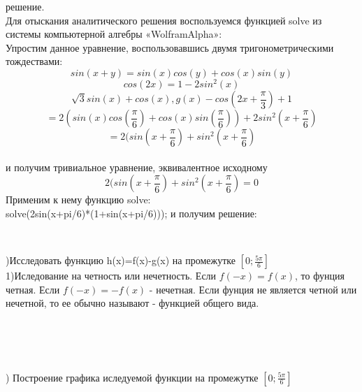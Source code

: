 \documentclass[russian,utf8,nocolumnxxxi,nocolumnxxxii]{eskdtext}
\begin{document}
\newpage
{ решение.}\\
Для отыскания аналитического решения воспользуемся функцией solve из системы компьютерной алгебры «WolframAlpha»:\\
Упростим данное уравнение, воспользовавшись двумя тригонометрическими тождествами: $$sin(x+y)=sin(x)cos(y)+cos(x)sin(y)$$
$$cos(2x)=1-2sin^2(x) $$
$$\sqrt{3}sin(x)+cos(x),g(x)-cos(2x+\frac{\pi}{3})+1$$ $$=2(sin(x)cos(\frac{\pi}{6})+cos(x)sin(\frac{\pi}{6}))+2sin^2(x+\frac{\pi}{6})$$ $$=2(sin(x+\frac{\pi}{6})+sin^2(x+\frac{\pi}{6})$$\\
и получим тривиальное уравнение, эквивалентное исходному
$$2(sin(x+\frac{\pi}{6})+sin^2(x+\frac{\pi}{6})=0$$
Применим к нему функцию solve:\\
solve(2sin(x+pi/6)*(1+sin(x+pi/6)));
и получим решение:
\begin{center}
\begin{minipage}[h]{0.65\linewidth}
  \\
\end{minipage}
\end{center}

\newpage
{)Исследовать функцию h(x)=f(x)-g(x) на промежутке $[0;\frac{5\pi}{6}]$ }\\
1)Иследование на четность или нечетность.
Если $f(-x)=f(x)$, то фунция четная. Если $f(-x)=-f(x)$ - нечетная. Если фунция не является четной или нечетной, то ее обычно называют - функцией общего вида.\\
\begin{center}
\begin{minipage}[h]{0.65\linewidth}
  \\
  \\
  \\
\end{minipage}
\end{center}

) Построение графика иследуемой функции на промежутке $[0;\frac{5\pi}{6}]$ \\
\begin{center}
\begin{minipage}[h]{0.65\linewidth}
  \\
\end{minipage}
  \\
\end{center}
\end{document}

